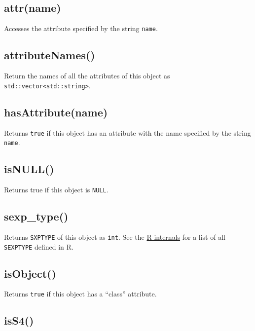 \documentclass[
]{book}
\begin{document}
\hypertarget{attrname}{%
\subsection{attr(name)}\label{attrname}}

Accesses the attribute specified by the string \texttt{name}.

\hypertarget{attributenames}{%
\subsection{attributeNames()}\label{attributenames}}

Return the names of all the attributes of this object as \texttt{std::vector\textless{}std::string\textgreater{}}.

\hypertarget{hasattributename}{%
\subsection{hasAttribute(name)}\label{hasattributename}}

Returns \texttt{true} if this object has an attribute with the name specified by the string \texttt{name}.

\hypertarget{isnull}{%
\subsection{isNULL()}\label{isnull}}

Returns true if this object is \texttt{NULL}.

\hypertarget{sexp_type}{%
\subsection{sexp\_type()}\label{sexp_type}}

Returns \texttt{SXPTYPE} of this object as \texttt{int}. See the \href{https://cran.r-project.org/doc/manuals/r-release/R-ints.html\#SEXPTYPEs}{R internals} for a list of all \texttt{SEXPTYPE} defined in R.

\hypertarget{isobject}{%
\subsection{isObject()}\label{isobject}}

Returns \texttt{true} if this object has a ``class'' attribute.

\hypertarget{iss4}{%
\subsection{isS4()}\label{iss4}}
\end{document}

